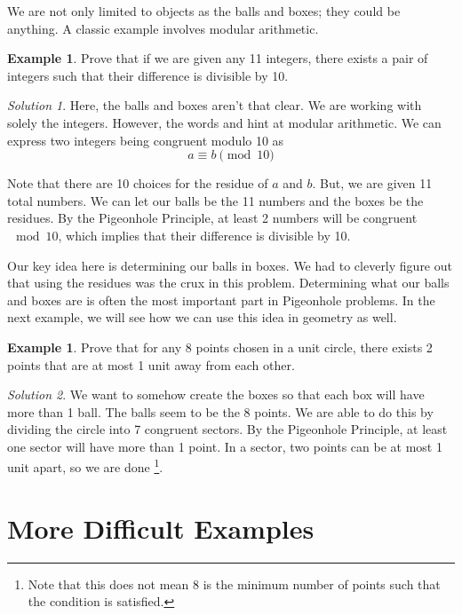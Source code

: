 \documentclass[l1pt]{article}
\theoremstyle{plain}
\theoremstyle{definition}
\newtheorem{example}[thm]{Example}
\theoremstyle{remark}
\newtheorem*{solution}{Solution}
\begin{document}
\bigskip

We are not only limited to objects as the balls and boxes; they could be anything. A classic example involves modular arithmetic.

\begin{example}
\label{example:easymod}
Prove that if we are given any 11 integers, there exists a pair of integers such that their difference is divisible by 10.
\end{example}

\begin{solution}
Here, the balls and boxes aren't that clear. We are working with solely the integers. However, the words  and  hint at modular arithmetic. We can express two integers being congruent modulo 10 as \[a \equiv b \pmod {10}\]

Note that there are 10 choices for the residue of $a$ and $b$. But, we are given 11 total numbers. We can let our balls be the 11 numbers and the boxes be the residues. By the Pigeonhole Principle, at least 2 numbers will be congruent $\mod 10$, which implies that their difference is divisible by 10.
\end{solution}

\bigskip

Our key idea here is determining our balls in boxes. We had to cleverly figure out that using the residues was the crux in this problem. Determining what our balls and boxes are is often the most important part in Pigeonhole problems. In the next example, we will see how we can use this idea in geometry as well.

\begin{example}
Prove that for any 8 points chosen in a unit circle, there exists 2 points that are at most 1 unit away from each other.
\end{example}

\begin{solution}
We want to somehow create the boxes so that each box will have more than 1 ball. The balls seem to be the 8 points. We are able to do this by dividing the circle into 7 congruent sectors. By the Pigeonhole Principle, at least one sector will have more than 1 point. In a sector, two points can be at most 1 unit apart, so we are done \footnote{Note that this does not mean 8 is the minimum number of points such that the condition is satisfied.}.
\end{solution}

\bigskip

\section{More Difficult Examples}
\end{document}

